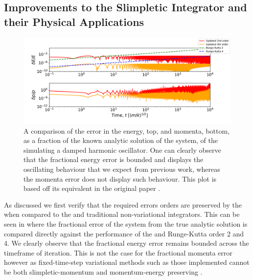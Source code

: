 \subsection{Improvements to the Slimpletic Integrator and their Physical Applications}
\label{sec:results-si}

\begin{figure}[t]
\label{fig:dho_energy_bounds}
  \includegraphics[width=\columnwidth]{figures/dho_energy_momenta_fractional_err.pdf}
  \caption{A comparison of the error in the energy, top, and momenta, bottom, as a fraction of the known analytic solution of the system, of the \updimpl{} simulating a damped harmonic oscillator. One can clearly observe that the fractional energy error is bounded and displays the oscillating behaviour that we expect from previous work, whereas the momenta error does not display such behaviour. This plot is based off its equivalent in the original paper \cite[Figure 2, bottom]{tsangSLIMPLECTICINTEGRATORSVARIATIONAL2015}.}
\end{figure}

As discussed we first verify that the required errors orders are preserved by the \updimpl{} when compared to the \orgimpl{} and traditional non-variational integrators. This can be seen in  where the fractional error of the system from the true analytic solution is compared directly against the performance of the \orgimpl{} and Runge-Kutta order 2 and 4. We clearly observe that the fractional energy error remains bounded across the timeframe of iteration. This is not the case for the fractional momenta error however as fixed-time-step variational methods such as those implemented cannot be both slimpletic-momentum and momentum-energy preserving \cite{zhongLiePoissonHamiltonJacobiTheory1988}.

